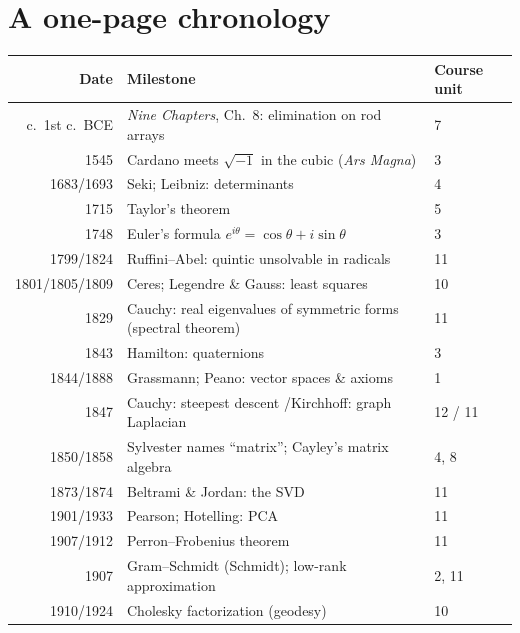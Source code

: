 \documentclass[11pt]{article}
\begin{document}
\section*{A one-page chronology}
\begin{center}
\renewcommand{\arraystretch}{1.15}
\begin{tabular}{@{}r l l@{}}
\toprule
\textbf{Date} & \textbf{Milestone} & \textbf{Course unit} \\
\midrule
c.\ 1st c.\ BCE & \emph{Nine Chapters}, Ch.\ 8: elimination on rod arrays & 7 \\
1545 & Cardano meets $\sqrt{-1}$ in the cubic (\emph{Ars Magna})           & 3 \\
1683/1693 & Seki; Leibniz: determinants                                     & 4 \\
1715 & Taylor's theorem                                                     & 5 \\
1748 & Euler's formula $e^{i\theta}=\cos\theta+i\sin\theta$                 & 3 \\
1799/1824 & Ruffini--Abel: quintic unsolvable in radicals                   & 11 \\
1801/1805/1809 & Ceres; Legendre \& Gauss: least squares                    & 10 \\
1829 & Cauchy: real eigenvalues of symmetric forms (spectral theorem)       & 11 \\
1843 & Hamilton: quaternions                                                & 3 \\
1844/1888 & Grassmann; Peano: vector spaces \& axioms                       & 1 \\
1847 & Cauchy: steepest descent \quad/\quad Kirchhoff: graph Laplacian      & 12 / 11 \\
1850/1858 & Sylvester names ``matrix''; Cayley's matrix algebra             & 4, 8 \\
1873/1874 & Beltrami \& Jordan: the SVD                                      & 11 \\
1901/1933 & Pearson; Hotelling: PCA                                         & 11 \\
1907/1912 & Perron--Frobenius theorem                                       & 11 \\
1907 & Gram--Schmidt (Schmidt); low-rank approximation                      & 2, 11 \\
1910/1924 & Cholesky factorization (geodesy)                                & 10 \\

\end{tabular}
\end{center}
\end{document}
